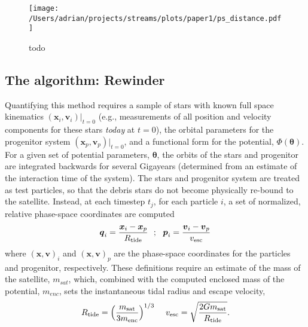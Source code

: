 \documentclass[preprint]{aastex}
\newcommand{\bs}{\boldsymbol}
\begin{document}
\begin{figure}[h]
\begin{center}
\texttt{[image: /Users/adrian/projects/streams/plots/paper1/ps\_distance.pdf]}
\caption{ todo }\label{fig:ps_distance}
\end{center}
\end{figure}

\subsection{The algorithm: Rewinder}
Quantifying this method requires a sample of stars with known full
space kinematics $(\bs{x}_{i}, \bs{v}_{i})|_{t=0}$ (e.g., measurements of all position and velocity components for these stars \emph{today} at $t=0$), the orbital parameters
for the progenitor system $(\bs{x}_p, \bs{v}_p)|_{t=0}$, and a
functional form for the potential, $\Phi({\boldsymbol\theta})$. For a
given set of potential parameters, $\boldsymbol\theta$, the orbits of the stars and
progenitor are integrated backwards for several Gigayears (determined from an
estimate of the interaction time of the system). The stars and
progenitor system are treated as test particles, so that the debris
stars do not become physically re-bound to the satellite. Instead, at each
timestep $t_j$, for each particle $i$, a set of normalized, relative
phase-space coordinates are
computed 
\begin{equation}
  \bs{q}_{i} = \frac{\bs{x}_{i} -
    \bs{x}_{p}}{R_{\rm tide}}\,\,\,\,;\,\,\,\,\bs{p}_{i} = \frac{\bs{v}_{i} -
    \bs{v}_{p}}{v_{\rm esc}}
\end{equation}
where $(\bs{x},\bs{v})_{i}$ and $(\bs{x},\bs{v})_{p}$ are the phase-space coordinates for the particles and progenitor, respectively. These definitions require an estimate of the mass of the
satellite, $m_{sat}$, which, combined with the computed enclosed mass
of the potential, $m_{enc}$, sets the instantaneous tidal radius and
escape velocity,
\begin{equation}
  R_{\rm tide}=\Big(\frac{m_{\rm sat}}{3m_{\rm enc}}\Big)^{1/3}\,\,\,\,\,\,\,\,
  v_{\rm esc}=\sqrt{\frac{2Gm_{\rm sat}}{R_{\rm tide}}}.
\end{equation}
\end{document}
